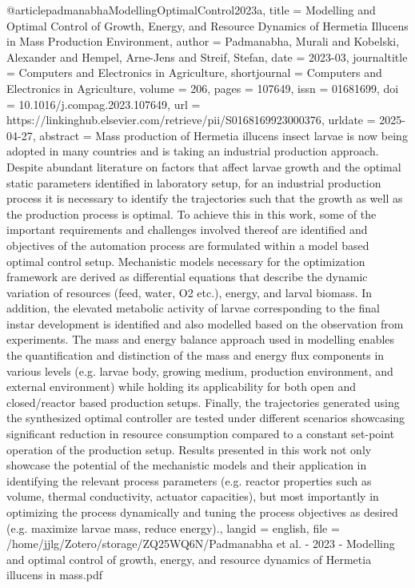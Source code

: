 {{{{@article{padmanabhaModellingOptimalControl2023a,
  title = {Modelling and Optimal Control of Growth, Energy, and Resource Dynamics of {{Hermetia}} Illucens in Mass Production Environment},
  author = {Padmanabha, Murali and Kobelski, Alexander and Hempel, Arne-Jens and Streif, Stefan},
  date = {2023-03},
  journaltitle = {Computers and Electronics in Agriculture},
  shortjournal = {Computers and Electronics in Agriculture},
  volume = {206},
  pages = {107649},
  issn = {01681699},
  doi = {10.1016/j.compag.2023.107649},
  url = {https://linkinghub.elsevier.com/retrieve/pii/S0168169923000376},
  urldate = {2025-04-27},
  abstract = {Mass production of Hermetia illucens insect larvae is now being adopted in many countries and is taking an industrial production approach. Despite abundant literature on factors that affect larvae growth and the optimal static parameters identified in laboratory setup, for an industrial production process it is necessary to identify the trajectories such that the growth as well as the production process is optimal. To achieve this in this work, some of the important requirements and challenges involved thereof are identified and objectives of the automation process are formulated within a model based optimal control setup. Mechanistic models necessary for the optimization framework are derived as differential equations that describe the dynamic variation of resources (feed, water, O2 etc.), energy, and larval biomass. In addition, the elevated metabolic activity of larvae corresponding to the final instar development is identified and also modelled based on the observation from experiments. The mass and energy balance approach used in modelling enables the quantification and distinction of the mass and energy flux components in various levels (e.g. larvae body, growing medium, production environment, and external environment) while holding its applicability for both open and closed/reactor based production setups. Finally, the trajectories generated using the synthesized optimal controller are tested under different scenarios showcasing significant reduction in resource consumption compared to a constant set-point operation of the production setup. Results presented in this work not only showcase the potential of the mechanistic models and their application in identifying the relevant process parameters (e.g. reactor properties such as volume, thermal conductivity, actuator capacities), but most importantly in optimizing the process dynamically and tuning the process objectives as desired (e.g. maximize larvae mass, reduce energy).},
  langid = {english},
  file = {/home/jjlg/Zotero/storage/ZQ25WQ6N/Padmanabha et al. - 2023 - Modelling and optimal control of growth, energy, and resource dynamics of Hermetia illucens in mass.pdf}
}

}}}}
